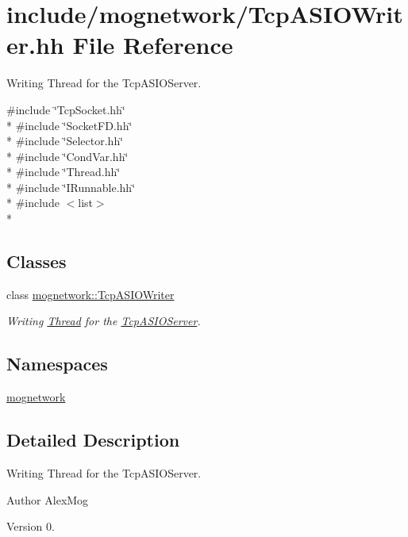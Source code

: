 \hypertarget{_tcp_a_s_i_o_writer_8hh}{\section{include/mognetwork/\-Tcp\-A\-S\-I\-O\-Writer.hh File Reference}
\label{_tcp_a_s_i_o_writer_8hh}
}


Writing Thread for the Tcp\-A\-S\-I\-O\-Server.  


{\ttfamily \#include \char`\"{}Tcp\-Socket.\-hh\char`\"{}}\\*
{\ttfamily \#include \char`\"{}Socket\-F\-D.\-hh\char`\"{}}\\*
{\ttfamily \#include \char`\"{}Selector.\-hh\char`\"{}}\\*
{\ttfamily \#include \char`\"{}Cond\-Var.\-hh\char`\"{}}\\*
{\ttfamily \#include \char`\"{}Thread.\-hh\char`\"{}}\\*
{\ttfamily \#include \char`\"{}I\-Runnable.\-hh\char`\"{}}\\*
{\ttfamily \#include $<$list$>$}\\*
\subsection*{Classes}
\begin{DoxyCompactItemize}
\item 
class \hyperlink{classmognetwork_1_1_tcp_a_s_i_o_writer}{mognetwork\-::\-Tcp\-A\-S\-I\-O\-Writer}
\begin{DoxyCompactList}\small\item\em Writing \hyperlink{classmognetwork_1_1_thread}{Thread} for the \hyperlink{classmognetwork_1_1_tcp_a_s_i_o_server}{Tcp\-A\-S\-I\-O\-Server}. \end{DoxyCompactList}\end{DoxyCompactItemize}
\subsection*{Namespaces}
\begin{DoxyCompactItemize}
\item 
\hyperlink{namespacemognetwork}{mognetwork}
\end{DoxyCompactItemize}


\subsection{Detailed Description}
Writing Thread for the Tcp\-A\-S\-I\-O\-Server. \begin{DoxyAuthor}{Author}
Alex\-Mog 
\end{DoxyAuthor}
\begin{DoxyVersion}{Version}
0. 
\end{DoxyVersion}
